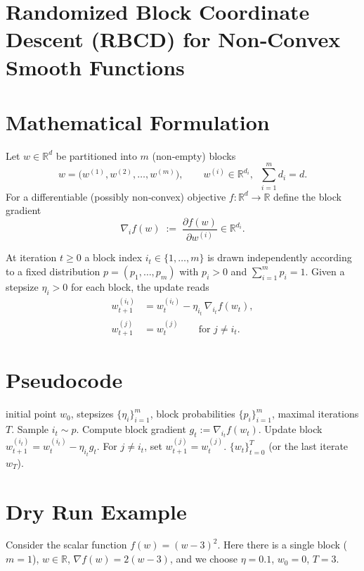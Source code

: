 \documentclass{article}
\newcommand{\R}{\mathbb{R}}
\begin{document}
\section*{Randomized Block Coordinate Descent (RBCD) for Non‑Convex Smooth Functions}

\section*{Mathematical Formulation}
Let $w\in\R^{d}$ be partitioned into $m$ (non‑empty) blocks
\[
w=\bigl(w^{(1)},w^{(2)},\dots ,w^{(m)}\bigr),\qquad 
w^{(i)}\in\R^{d_i},\;\; \sum_{i=1}^{m}d_i=d .
\]
For a differentiable (possibly non‑convex) objective $f:\R^{d}\to\R$ define the block gradient
\[
\nabla_i f(w)\;:=\;\frac{\partial f(w)}{\partial w^{(i)}}\in\R^{d_i}.
\]

At iteration $t\ge0$ a block index $i_t\in\{1,\dots,m\}$ is drawn independently
according to a fixed distribution $p=(p_1,\dots ,p_m)$ with $p_i>0$ and
$\sum_{i=1}^{m}p_i=1$.
Given a stepsize $\eta_i>0$ for each block, the update reads
\[
\boxed{
\begin{aligned}
w_{t+1}^{(i_t)} &= w_{t}^{(i_t)}-\eta_{i_t}\,\nabla_{i_t}f(w_t),\\
w_{t+1}^{(j)}   &= w_{t}^{(j)}\qquad\text{for }j\neq i_t .
\end{aligned}}
\tag{RBCD}
\]

\section*{Pseudocode}
\begin{algorithm}[H]
\caption{Randomized Block Coordinate Descent (RBCD)}
\begin{algorithmic}[1]
 initial point $w_0$, stepsizes $\{\eta_i\}_{i=1}^{m}$, block probabilities $\{p_i\}_{i=1}^{m}$, maximal iterations $T$.
    \STATE Sample $i_t\sim p$.
    \STATE Compute block gradient $g_t:=\nabla_{i_t}f(w_t)$.
    \STATE Update block $w_{t+1}^{(i_t)} = w_t^{(i_t)}-\eta_{i_t}g_t$.
    \STATE For $j\neq i_t$, set $w_{t+1}^{(j)}=w_t^{(j)}$.
\ENDFOR
{} $\{w_t\}_{t=0}^{T}$ (or the last iterate $w_T$).
\end{algorithmic}
\end{algorithm}

\section*{Dry Run Example}
Consider the scalar function $f(w)=(w-3)^2$.
Here there is a single block ($m=1$), $w\in\R$, $\nabla f(w)=2(w-3)$,
and we choose $\eta=0.1$, $w_0=0$, $T=3$.
\end{document}
